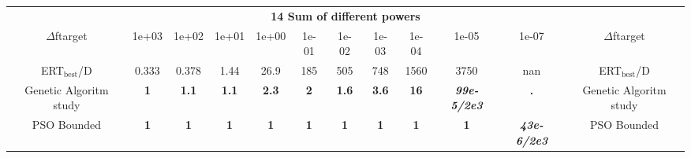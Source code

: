 \begin{tabular}{cccccccccccc}
 & \multicolumn{10}{c}{{\normalsize \textbf{14 Sum of different powers}}}\\
$\Delta$ftarget& 1e+03& 1e+02& 1e+01& 1e+00& 1e-01& 1e-02& 1e-03& 1e-04& 1e-05& 1e-07 & $\Delta$ftarget \\
ERT$_{\textrm{best}}$/D& 0.333& 0.378& 1.44& 26.9& 185& 505& 748& 1560& 3750& nan & ERT$_{\textrm{best}}$/D \\
\hline
Genetic Algoritm study & \textbf{1} & \textbf{1.1} & \textbf{1.1} & \textbf{2.3} & \textbf{2} & \textbf{1.6} & \textbf{3.6} & \textbf{16} & \textbf{\textit{99e-5}\textit{/2e3}} & \textbf{.} & Genetic Algoritm study \cite{add_an_entry_for_Genetic Algoritm study_in_bbob.bib}\\
PSO Bounded & \textbf{1} & \textbf{1} & \textbf{1} & \textbf{1} & \textbf{1} & \textbf{1} & \textbf{1} & \textbf{1} & \textbf{1} & \textbf{\textit{43e-6}\textit{/2e3}} & PSO Bounded \cite{add_an_entry_for_PSO Bounded_in_bbob.bib}
\end{tabular}
